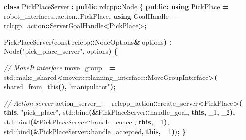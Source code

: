 \documentclass[
]{article}
\newenvironment{Shaded}{\begin{snugshade}}{\end{snugshade}}
\newcommand{\AttributeTok}[1]{\textcolor[rgb]{0.13,0.29,0.53}{#1}}
\newcommand{\BuiltInTok}[1]{#1}
\newcommand{\CommentTok}[1]{\textcolor[rgb]{0.56,0.35,0.01}{\textit{#1}}}
\newcommand{\KeywordTok}[1]{\textcolor[rgb]{0.13,0.29,0.53}{\textbf{#1}}}
\newcommand{\NormalTok}[1]{#1}
\newcommand{\OperatorTok}[1]{\textcolor[rgb]{0.81,0.36,0.00}{\textbf{#1}}}
\newcommand{\StringTok}[1]{\textcolor[rgb]{0.31,0.60,0.02}{#1}}
\newcommand{\VariableTok}[1]{\textcolor[rgb]{0.00,0.00,0.00}{#1}}
\begin{document}
\begin{Shaded}
\begin{Highlighting}[]
\KeywordTok{class}\NormalTok{ PickPlaceServer }\OperatorTok{:} \KeywordTok{public}\NormalTok{ rclcpp}\OperatorTok{::}\NormalTok{Node }\OperatorTok{\{}
\KeywordTok{public}\OperatorTok{:}
    \KeywordTok{using}\NormalTok{ PickPlace }\OperatorTok{=}\NormalTok{ robot\_interfaces}\OperatorTok{::}\NormalTok{action}\OperatorTok{::}\NormalTok{PickPlace}\OperatorTok{;}
    \KeywordTok{using}\NormalTok{ GoalHandle }\OperatorTok{=}\NormalTok{ rclcpp\_action}\OperatorTok{::}\NormalTok{ServerGoalHandle}\OperatorTok{\textless{}}\NormalTok{PickPlace}\OperatorTok{\textgreater{};}

\NormalTok{    PickPlaceServer}\OperatorTok{(}\AttributeTok{const}\NormalTok{ rclcpp}\OperatorTok{::}\NormalTok{NodeOptions}\OperatorTok{\&}\NormalTok{ options}\OperatorTok{)}
        \OperatorTok{:}\NormalTok{ Node}\OperatorTok{(}\StringTok{"pick\_place\_server"}\OperatorTok{,}\NormalTok{ options}\OperatorTok{)} \OperatorTok{\{}

        \CommentTok{// MoveIt interface}
        \VariableTok{move\_group\_} \OperatorTok{=} \BuiltInTok{std::}\NormalTok{make\_shared}\OperatorTok{\textless{}}\NormalTok{moveit}\OperatorTok{::}\NormalTok{planning\_interface}\OperatorTok{::}\NormalTok{MoveGroupInterface}\OperatorTok{\textgreater{}(}
\NormalTok{            shared\_from\_this}\OperatorTok{(),} \StringTok{"manipulator"}\OperatorTok{);}

        \CommentTok{// Action server}
        \VariableTok{action\_server\_} \OperatorTok{=}\NormalTok{ rclcpp\_action}\OperatorTok{::}\NormalTok{create\_server}\OperatorTok{\textless{}}\NormalTok{PickPlace}\OperatorTok{\textgreater{}(}
            \KeywordTok{this}\OperatorTok{,} \StringTok{"pick\_place"}\OperatorTok{,}
            \BuiltInTok{std::}\NormalTok{bind}\OperatorTok{(\&}\NormalTok{PickPlaceServer}\OperatorTok{::}\NormalTok{handle\_goal}\OperatorTok{,} \KeywordTok{this}\OperatorTok{,}\NormalTok{ \_1}\OperatorTok{,}\NormalTok{ \_2}\OperatorTok{),}
            \BuiltInTok{std::}\NormalTok{bind}\OperatorTok{(\&}\NormalTok{PickPlaceServer}\OperatorTok{::}\NormalTok{handle\_cancel}\OperatorTok{,} \KeywordTok{this}\OperatorTok{,}\NormalTok{ \_1}\OperatorTok{),}
            \BuiltInTok{std::}\NormalTok{bind}\OperatorTok{(\&}\NormalTok{PickPlaceServer}\OperatorTok{::}\NormalTok{handle\_accepted}\OperatorTok{,} \KeywordTok{this}\OperatorTok{,}\NormalTok{ \_1}\OperatorTok{));}
    \OperatorTok{\}}


\end{Highlighting}
\end{Shaded}
\end{document}
